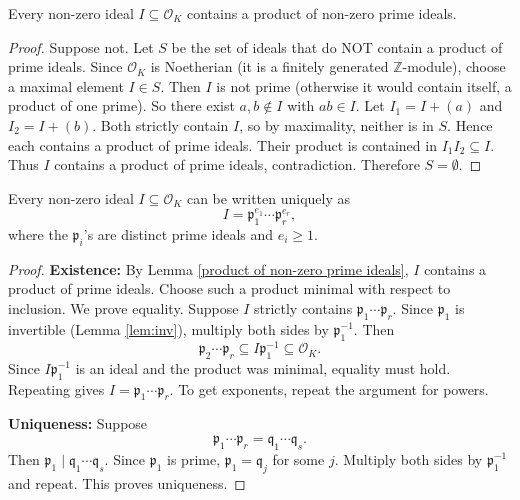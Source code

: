 \begin{lemma}\label{product of non-zero prime ideals}
Every non-zero ideal \(I \subseteq \mathcal{O}_K\) contains a product of non-zero prime ideals.
\end{lemma}

\begin{proof}
Suppose not. Let \(S\) be the set of ideals that do NOT contain a product of prime ideals. Since \(\mathcal{O}_K\) is Noetherian (it is a finitely generated \(\mathbb{Z}\)-module), choose a maximal element \(I \in S\). Then \(I\) is not prime (otherwise it would contain itself, a product of one prime). So there exist \(a, b \notin I\) with \(ab \in I\). Let \(I_1 = I + (a)\) and \(I_2 = I + (b)\). Both strictly contain \(I\), so by maximality, neither is in \(S\). Hence each contains a product of prime ideals. Their product is contained in \(I_1 I_2 \subseteq I\). Thus \(I\) contains a product of prime ideals, contradiction. Therefore \(S = \emptyset\).
\end{proof}

\begin{thm}\label{thm:to prime ideals}
Every non-zero ideal \(I \subseteq \mathcal{O}_K\) can be written uniquely as
\[
I = \mathfrak{p}_1^{e_1} \cdots \mathfrak{p}_r^{e_r},
\]
where the \(\mathfrak{p}_i\)'s are distinct prime ideals and \(e_i \ge 1\).
\end{thm}

\begin{proof}
\textbf{Existence:} By Lemma \ref{product of non-zero prime ideals}, \(I\) contains a product of prime ideals. Choose such a product minimal with respect to inclusion. We prove equality. Suppose \(I\) strictly contains \(\mathfrak{p}_1 \cdots \mathfrak{p}_r\). Since \(\mathfrak{p}_1\) is invertible (Lemma \ref{lem:inv}), multiply both sides by \(\mathfrak{p}_1^{-1}\). Then
\[
\mathfrak{p}_2 \cdots \mathfrak{p}_r \subseteq I \mathfrak{p}_1^{-1} \subseteq \mathcal{O}_K.
\]
Since \(I \mathfrak{p}_1^{-1}\) is an ideal and the product was minimal, equality must hold. Repeating gives \(I = \mathfrak{p}_1 \cdots \mathfrak{p}_r\). To get exponents, repeat the argument for powers.

\textbf{Uniqueness:} Suppose
\[
\mathfrak{p}_1 \cdots \mathfrak{p}_r = \mathfrak{q}_1 \cdots \mathfrak{q}_s.
\]
Then \(\mathfrak{p}_1 \mid \mathfrak{q}_1 \cdots \mathfrak{q}_s\). Since \(\mathfrak{p}_1\) is prime, \(\mathfrak{p}_1 = \mathfrak{q}_j\) for some \(j\). Multiply both sides by \(\mathfrak{p}_1^{-1}\) and repeat. This proves uniqueness.
\end{proof}


